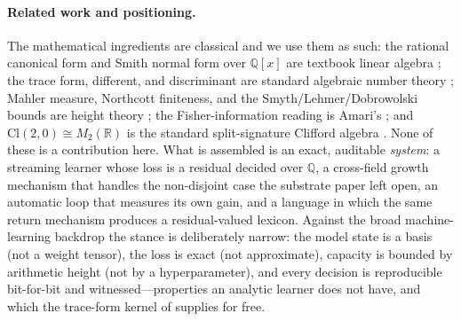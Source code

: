 \documentclass[11pt]{article}
\theoremstyle{plain}
\theoremstyle{definition}
\theoremstyle{remark}
\newcommand{\Q}{\mathbb{Q}}
\newcommand{\R}{\mathbb{R}}
\newcommand{\Cl}{\mathrm{Cl}}
\begin{document}
\paragraph{Related work and positioning.} The mathematical ingredients are classical and we use them as such:
the rational canonical form and Smith normal form over $\Q[x]$ are textbook linear algebra
\cite{DummitFoote,Cohen}; the trace form, different, and discriminant are standard algebraic number theory
\cite{Neukirch,Marcus}; Mahler measure, Northcott finiteness, and the Smyth/Lehmer/Dobrowolski bounds are
height theory \cite{Mahler,Northcott,Smyth,Lehmer,Dobrowolski,BombieriGubler}; the Fisher-information reading
is Amari's \cite{Amari,AmariNagaoka}; and $\Cl(2,0)\cong M_2(\R)$ is the standard split-signature Clifford
algebra \cite{Lounesto}. None of these is a contribution here. What is assembled is an exact, auditable
\emph{system}: a streaming learner whose loss is a residual decided over $\Q$, a cross-field growth mechanism
that handles the non-disjoint case the substrate paper left open, an automatic loop that measures its own
gain, and a language in which the same return mechanism produces a residual-valued lexicon. Against the broad
machine-learning backdrop the stance is deliberately narrow: the model state is a basis (not a weight tensor),
the loss is exact (not approximate), capacity is bounded by arithmetic height (not by a hyperparameter), and
every decision is reproducible bit-for-bit and witnessed---properties an analytic learner does not have, and
which the trace-form kernel of \cite{VectorSubstrate} supplies for free.
\end{document}
